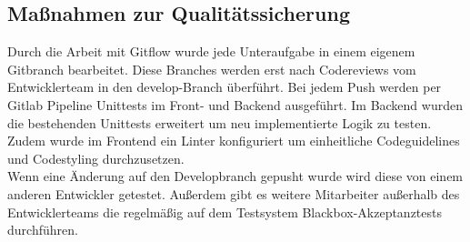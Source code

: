 \subsection{Maßnahmen zur Qualitätssicherung}
\label{qualitaetssicherung}
Durch die Arbeit mit Gitflow wurde jede Unteraufgabe in einem eigenem Gitbranch bearbeitet. Diese Branches werden erst nach Codereviews vom Entwicklerteam in den develop-Branch überführt. Bei jedem Push werden per Gitlab Pipeline Unittests im Front- und Backend ausgeführt. Im Backend wurden die bestehenden Unittests erweitert um neu implementierte Logik zu testen. Zudem wurde im Frontend ein \gls{Linter} konfiguriert um einheitliche Codeguidelines und Codestyling durchzusetzen.\\
Wenn eine Änderung auf den Developbranch gepusht wurde wird diese von einem anderen Entwickler getestet. Außerdem gibt es weitere Mitarbeiter außerhalb des Entwicklerteams die regelmäßig auf dem Testsystem Blackbox-Akzeptanztests durchführen.